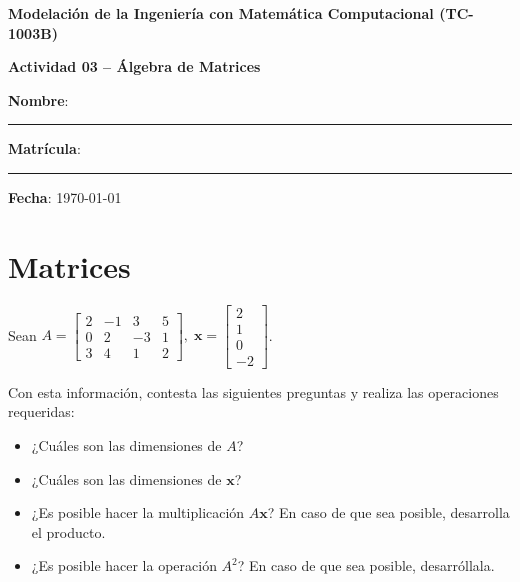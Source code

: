 \documentclass[spanish, 10pt]{article}
\begin{document}
\begin{center}
	{\Large \textbf{Modelación de la Ingeniería con Matemática Computacional (TC-1003B)}}
	
	\bigskip
	{\large \textbf{Actividad 03 -- Álgebra de Matrices}}
\end{center}

\bigskip
{\large \textbf{Nombre}: \rule{13.7 cm}{0.4mm}}



\bigskip
{\large \textbf{Matrícula}: \rule{5 cm}{0.4mm}} \hfill {\large \textbf{Fecha}: \today}

\bigskip


\section{Matrices}

\vspace{3ex}

Sean $A = \begin{bmatrix}
    2 & -1 & 3 & 5 \\
    0 & 2 & -3 & 1 \\
    3 & 4 & 1 & 2
\end{bmatrix}, \;
\mathbf{x} = \begin{bmatrix}    
2 \\ 1 \\ 0 \\ -2
\end{bmatrix}$.

\vspace{3ex}

Con esta información, contesta las siguientes preguntas y realiza las operaciones requeridas:

\begin{itemize}
    \item ¿Cuáles son las dimensiones de $A$?
    \item ¿Cuáles son las dimensiones de $\mathbf{x}$?
    \item ¿Es posible hacer la multiplicación $A\mathbf{x}$? En caso de que sea posible, desarrolla el producto.
    \item ¿Es posible hacer la operación $A^2$? En caso de que sea posible, desarróllala.
\end{itemize}
\end{document}

